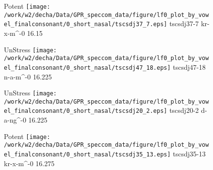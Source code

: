 \documentclass{article}
\begin{document}
\begin{figure}[t]
\begin{minipage}[b]{.24\textwidth}
\colorbox{Apricot}{Potent}
\centering
\texttt{[image: /work/w2/decha/Data/GPR\_speccom\_data/figure/lf0\_plot\_by\_vowel\_finalconsonant/0\_short\_nasal/tscsdj37\_7.eps]}
tscsdj37-7 kr-x-m\textasciicircum-0 16.15
\end{minipage}
\begin{minipage}[b]{.24\textwidth}
UnStress
\centering
\texttt{[image: /work/w2/decha/Data/GPR\_speccom\_data/figure/lf0\_plot\_by\_vowel\_finalconsonant/0\_short\_nasal/tscsdj47\_18.eps]}
tscsdj47-18 n-a-m\textasciicircum-0 16.225
\end{minipage}
\begin{minipage}[b]{.24\textwidth}
UnStress
\centering
\texttt{[image: /work/w2/decha/Data/GPR\_speccom\_data/figure/lf0\_plot\_by\_vowel\_finalconsonant/0\_short\_nasal/tscsdj20\_2.eps]}
tscsdj20-2 d-a-ng\textasciicircum-0 16.225
\end{minipage}
\begin{minipage}[b]{.24\textwidth}
\colorbox{Apricot}{Potent}
\centering
\texttt{[image: /work/w2/decha/Data/GPR\_speccom\_data/figure/lf0\_plot\_by\_vowel\_finalconsonant/0\_short\_nasal/tscsdj35\_13.eps]}
tscsdj35-13 kr-x-m\textasciicircum-0 16.275
\end{minipage}
\end{figure}
\end{document}
